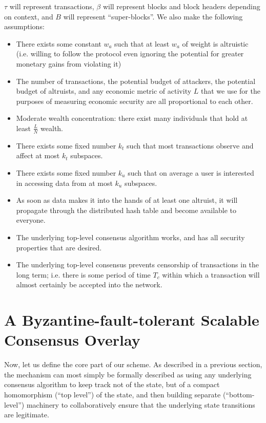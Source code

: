 \documentclass[11pt,a4paper]{article}
\makeatletter
\theoremstyle{plain}
\theoremstyle{definition}
\theoremstyle{remark}
\newcommand{\ie}{i.e.\@\xspace}
\makeatother
\begin{document}
$\tau$ will represent transactions, $\beta$ will represent blocks and block headers depending on context, and $B$ will represent ``super-blocks''. We also make the following assumptions:

\begin{itemize}
\item
There exists some constant $w_a$ such that at least $w_a$ of weight is altruistic (\ie willing to follow the protocol even ignoring the potential for greater monetary gains from violating it)
\item
The number of transactions, the potential budget of attackers, the potential budget of altruists, and any economic metric of activity $L$ that we use for the purposes of measuring economic security are all proportional to each other.
\item
Moderate wealth concentration: there exist many individuals that hold at least $\frac{L}{N}$ wealth.
\item
There exists some fixed number $k_t$ such that most transactions observe and affect at most $k_t$ subspaces.
\item
There exists some fixed number $k_u$ such that on average a user is interested in accessing data from at most $k_u$ subspaces.
\item
As soon as data makes it into the hands of at least one altruist, it will propagate through the distributed hash table and become available to everyone.
\item
The underlying top-level consensus algorithm works, and has all security properties that are desired.
\item
The underlying top-level consensus prevents censorship of transactions in the long term; \ie there is some period of time $T_c$ within which a transaction will almost certainly be accepted into the network.
\end{itemize}

\section{A Byzantine-fault-tolerant Scalable Consensus Overlay}

Now, let us define the core part of our scheme. As described in a previous section, the mechanism can most simply be formally described as using any underlying consensus algorithm to keep track not of the state, but of a compact homomorphism (``top level'') of the state, and then building separate (``bottom-level'') machinery to collaboratively ensure that the underlying state transitions are legitimate.
\end{document}
